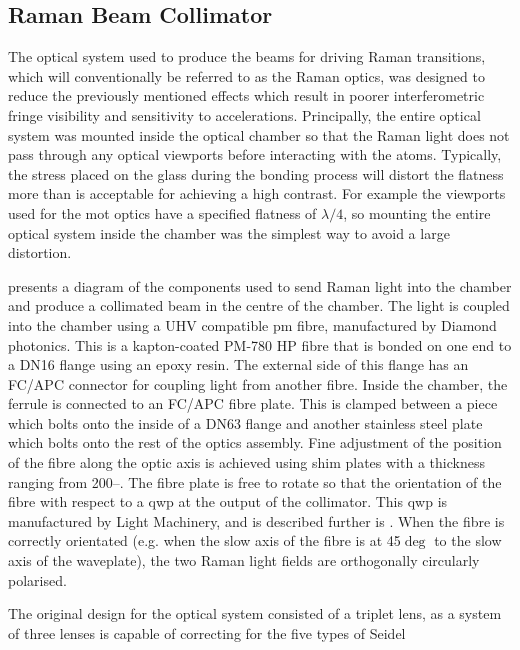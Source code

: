 \subsection{Raman Beam Collimator}\label{subsec:setup_ramancollimator}
The optical system used to produce the beams for driving Raman transitions,
which will conventionally be referred to as the Raman optics, was designed to
reduce the previously mentioned effects which result in poorer
interferometric fringe visibility and sensitivity to accelerations.
Principally, the entire optical system was mounted inside the optical chamber
so that the Raman light does not pass through any optical viewports before
interacting with the atoms. Typically, the stress placed on the glass during
the bonding process will distort the flatness more than is acceptable for
achieving a high contrast. For example the viewports used for the \ac{mot}
optics have a specified flatness of \(\lambda/4\), so mounting the entire
optical system inside the chamber was the simplest way to avoid a large
distortion. \par\noindent
{} presents a diagram of the components used to
send Raman light into the chamber and produce a collimated beam in the centre
of the chamber. The light is coupled into the chamber using a UHV compatible
\ac{pm} fibre, manufactured by Diamond photonics. This is a kapton-coated
PM-780 HP fibre that is bonded on one end to a DN16 flange using an epoxy
resin. The external side of this flange has an FC/APC connector for coupling
light from another fibre. Inside the chamber, the ferrule is connected to an
FC/APC fibre plate. This is clamped between a piece which bolts onto the
inside of a DN63 flange and another stainless steel plate which bolts onto
the rest of the optics assembly. Fine adjustment of the position of the fibre
along the optic axis is achieved using shim plates with a thickness ranging
from 200--. The fibre plate is free to rotate so
that the orientation of the fibre with respect to a \ac{qwp} at the output of
the collimator. This \ac{qwp} is manufactured by Light Machinery, and is
described further is . When the fibre is
correctly orientated (e.g. when the slow axis of the fibre is at 45\(\deg\)
to the slow axis of the waveplate), the two Raman light fields are
orthogonally circularly polarised. \par\noindent
The original design for the optical system consisted of a triplet lens, as a
system of three lenses is capable of correcting for the five types of Seidel
